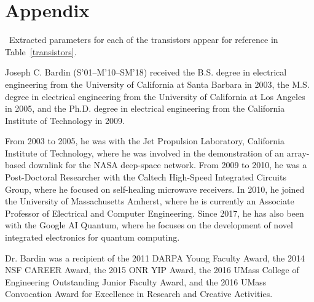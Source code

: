 \documentclass[journal]{IEEEtran}
\begin{document}
\section*{Appendix}\
Extracted parameters for each of the transistors appear for reference in Table~\ref{transistors}.






\begin{IEEEbiography}{Joseph C. Bardin}
(S'01--M'10--SM'18) received the B.S. degree in electrical engineering from the University of California at Santa Barbara in 2003, the M.S. degree in electrical engineering from the University of California at Los Angeles in 2005, and the Ph.D. degree in electrical engineering from the California Institute of Technology in 2009. 

From 2003 to 2005, he was with the Jet Propulsion Laboratory, California Institute of Technology, where he was involved in the demonstration of an array-based downlink for the NASA deep-space network. From 2009 to 2010, he was a Post-Doctoral Researcher with the Caltech High-Speed Integrated Circuits Group, where he focused on self-healing microwave receivers. In 2010, he joined the University of Massachusetts Amherst, where he is currently an Associate Professor of Electrical and Computer Engineering. Since 2017, he has also been with the Google AI Quantum, where he focuses on the development of novel integrated electronics for quantum computing. 

Dr. Bardin was a recipient of the 2011 DARPA Young Faculty Award, the 2014 NSF CAREER Award, the 2015 ONR YIP Award, the 2016 UMass College of Engineering Outstanding Junior Faculty Award, and the 2016 UMass Convocation Award for Excellence in Research and Creative Activities.
\end{IEEEbiography}
\end{document}
